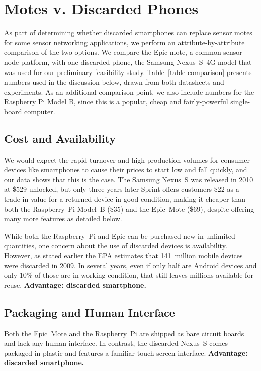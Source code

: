 \section{Motes v. Discarded Phones}
\label{sec-comparison}



As part of determining whether discarded smartphones can replace sensor motes
for some sensor networking applications, we perform an attribute-by-attribute
comparison of the two options. We compare the Epic mote, a common sensor node
platform, with one discarded phone, the Samsung Nexus~S~4G  model that was
used for our preliminary feasibility study. Table~\ref{table-comparison}
presents numbers used in the discussion below, drawn from both datasheets and
experiments. As an additional comparison point, we also include numbers for
the Raspberry Pi Model B, since this is a popular, cheap and fairly-powerful
single-board computer.

\subsection{Cost and Availability}

We would expect the rapid turnover and high production volumes for consumer
devices like smartphones to cause their prices to start low and fall quickly,
and our data shows that this is the case. The Samsung Nexus~S was released in
2010 at \$529 unlocked, but only three years later Sprint offers customers
\$22 as a trade-in value for a returned device in good condition, making it
cheaper than both the Raspberry~Pi Model~B (\$35) and the Epic~Mote (\$69),
despite offering many more features as detailed below.

While both the Raspberry~Pi and Epic can be purchased new in unlimited
quantities, one concern about the use of discarded devices is availability.
However, as stated earlier the EPA estimates that 141~million mobile devices
were discarded in 2009. In several years, even if only half are Android
devices and only 10\% of those are in working condition, that still leaves
millions available for reuse. \textbf{Advantage: discarded smartphone.}

\subsection{Packaging and Human Interface}

Both the Epic~Mote and the Raspberry~Pi are shipped as bare circuit boards
and lack any human interface. In contrast, the discarded Nexus~S comes
packaged in plastic and features a familiar touch-screen interface.
\textbf{Advantage: discarded smartphone.}

